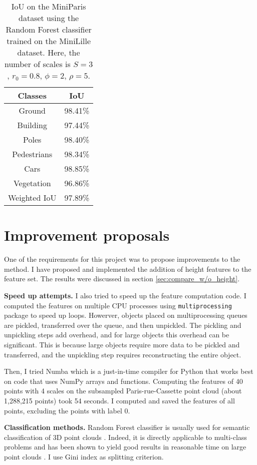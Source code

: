 \documentclass{article}
\begin{document}
\begin{table}[H]
    \centering
\begin{tabular}{cc}
    Classes & IoU \\
    \hline\hline
    Ground & 98.41\% \\
    Building & 97.44\% \\
    Poles & 98.40\% \\
    Pedestrians & 98.34\% \\
    Cars & 98.85\% \\
    Vegetation & 96.86\% \\
    \hline 
    Weighted IoU & 97.89\% \\
\end{tabular}
\caption{IoU on the MiniParis dataset using the Random Forest classifier trained on the MiniLille dataset. Here, the number of scales is $S=3$, $r_0=0.8$, $\phi=2$, $\rho=5$.}
\label{tab:results_generalization}
\end{table}

\section{Improvement proposals}\label{sec:classification}

One of the requirements for this project was to propose improvements to the method. I have proposed and implemented the addition of height features to the feature set. The results were discussed in section \ref{sec:compare_w/o_height}.

\textbf{Speed up attempts.} I also tried to speed up the feature computation code. I computed the features on multiple CPU processes using \texttt{multiprocessing} package to speed up loops. Howerver, objects placed on multiprocessing queues are pickled, transferred over the queue, and then unpickled. The pickling and unpickling steps add overhead, and for large objects this overhead can be significant. This is because large objects require more data to be pickled and transferred, and the unpickling step requires reconstructing the entire object. 

Then, I tried Numba which is a just-in-time compiler for Python that works best on code that uses NumPy arrays and functions. Computing the features of 40 points with 4 scales on the subsampled Paris-rue-Cassette point cloud (about 1,288,215 points) took 54 seconds. I computed and saved the features of all points, excluding the points with label 0. 

\textbf{Classification methods.} Random Forest classifier is usually used for semantic classification of 3D point clouds \cite{thomas_semantic_2018,hackel_fast_nodate}. Indeed, it is directly applicable to multi-class problems and has been shown to yield good results in reasonable time on large point clouds \cite{weinmann_semantic_2015,atik_machine_2021}. I use Gini index as splitting criterion.
\end{document}
